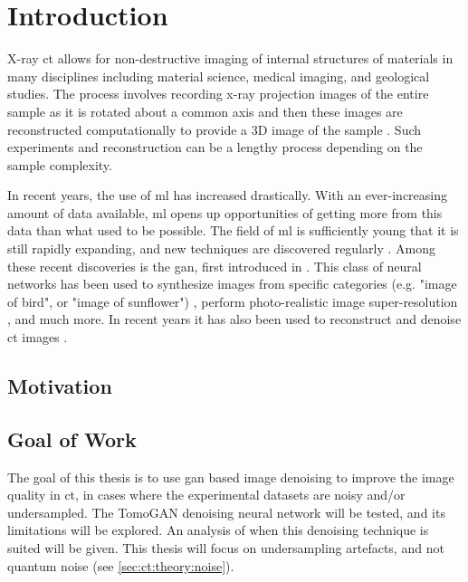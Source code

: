\chapter{Introduction}
\label{sec:introduction}
X-ray \gls{ct} allows for non-destructive imaging of internal structures of materials in many disciplines including material science, medical imaging, and geological studies. The process involves recording x-ray projection images of the entire sample as it is rotated about a common axis and then these images are reconstructed computationally to provide a 3D image of the sample \cite{KakSlaney98}. Such experiments and reconstruction can be a lengthy process depending on the sample complexity. 

In recent years, the use of \gls{ml} has increased drastically. With an ever-increasing amount of data available, \gls{ml} opens up opportunities of getting more from this data than what used to be possible. The field of \gls{ml} is sufficiently young that it is still rapidly expanding, and new techniques are discovered regularly \cite{Jordan255}. Among these recent discoveries is the \gls{gan}, first introduced in \citeyear{goodfellow2014gan} \cite{goodfellow2014gan}. This class of neural networks has been used to synthesize images from specific categories (e.g. "image of bird", or "image of sunflower") \cite{Bao_2017_ICCV}, perform photo-realistic image super-resolution \cite{Ledig_2017_CVPR}, and much more. In recent years it has also been used to reconstruct and denoise \gls{ct} images \cite{GANrec,liu2020tomogan}. 

\section{Motivation}


\section{Goal of Work}
The goal of this thesis is to use \gls{gan} based image denoising to improve the image quality in \gls{ct}, in cases where the experimental datasets are noisy and/or undersampled. The TomoGAN \cite{liu2020tomogan} denoising neural network will be tested, and its limitations will be explored. An analysis of when this denoising technique is suited will be given. This thesis will focus on undersampling artefacts, and not quantum noise (see \cref{sec:ct:theory:noise}). 

